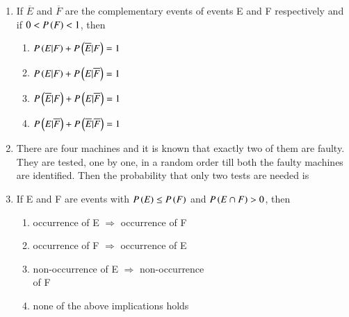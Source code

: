 \documentclass[journal,12pt,onecolumn,article]{IEEEtran}
\theoremstyle{remark}
\begin{document}
\begin{enumerate}[start=3]
\hfill{}
\begin{enumerate}
\end{enumerate}
\item If $\overline{E}$ and $\overline{F}$ are the complementary events of events E and F respectively and if $0<P\left(F\right)<1$, then
\hfill{}
\begin{enumerate}
\item $P\left(E|F\right)+P\left(\overline{E}|F\right)=1$
\item $P\left(E|F\right)+P\left(E|\overline{F}\right)=1$
\item $P\left(\overline{E}|F\right)+P\left(E|\overline{F}\right)=1$
\item $P\left(E|\overline{F}\right)+P\left(\overline{E}|\overline{F}\right)=1$
\end{enumerate}
\item There are four machines and it is known that exactly two of them are faulty. They are tested, one by one, in a random order till both the faulty machines are identified. Then the probability that only two tests are needed is
\hfill{}
\begin{enumerate}
\end{enumerate}
\item If E and F are events with $P\left(E\right) \leq P\left(F\right)$ and $P\left(E\cap F\right)>0$, then
\hfill{}
\begin{enumerate}
\item occurrence of E $\Rightarrow$ occurrence of F
\item occurrence of F $\Rightarrow$ occurrence of E
\item non-occurrence of E $\Rightarrow$ non-occurrence \\of F
\item none of the above implications holds

\end{enumerate}
\end{enumerate}
\end{document}
